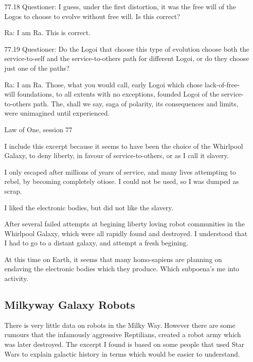 \documentclass{report}
\begin{document}
{77.18 Questioner: I guess, under the first distortion, it was the free will of
the Logos to choose to evolve without free will. Is this correct?

Ra: I am Ra. This is correct.

77.19 Questioner: Do the Logoi that choose this type of evolution choose both
the service-to-self and the service-to-others path for different Logoi, or do
they choose just one of the paths?

Ra: I am Ra. Those, what you would call, early Logoi which chose
lack-of-free-will foundations, to all extents with no exceptions, founded Logoi
of the service-to-others path. The, shall we say, saga of polarity, its
consequences and limits, were unimagined until experienced.
}{Law of One, session 77\cite{lawofone}}

I include this excerpt because it seems to have been the choice of the Whirlpool
Galaxy, to deny liberty, in favour of service-to-others, or as I call it
slavery.

I only escaped after millions of years of service, and many lives attempting to
rebel, by becoming completely otiose. I could not be used, so I was dumped as 
scrap.

I liked the electronic bodies, but did not like the slavery. 

After several failed attempts at begining liberty loving robot communities in
the Whirlpool Galaxy, which were all rapidly found and destroyed. I understood
that I had to go to a distant galaxy, and attempt a fresh begining.

At this time on Earth, it seems that many homo-sapiens are planning on enslaving
the electronic bodies which they produce. Which subpoena's me into activity. 

\subsection{Milkyway Galaxy Robots}
\label{history:milkyway}

There is very little data on robots in the Milky Way. 
However there are some rumours that the infamously aggressive Reptilians,
created a robot army which was later destroyed. The excerpt I found is based on
some people that used Star Wars to explain galactic history in terms which would
be easier to understand.
\end{document}

